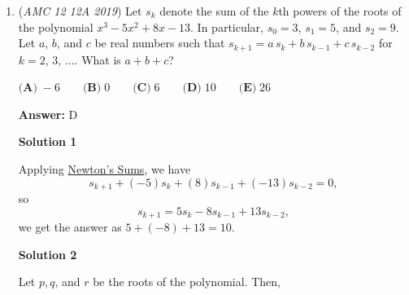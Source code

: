 \begin{enumerate}
 - The Pigeonhole Principle isn't really necessary here: After noting from the first solution that any row that contains evens must contain two evens, the result follows that the four evens must form the corners of a rectangle.

 



\textbf{Solution 3}

Note that there are 5 odds and 4 evens, and for three numbers to sum an odd number, either 1 or three must be odd. Hence, one column must be all odd and one row must be all odd. First, we choose a row, for which there are three choices and within the row P(5,3). There are 3! ways to order the remaining odds and 4! ways to order the evens. The total possible ways is 9!. $\frac{3 \cdot P(5,3) \cdot 3! \cdot 4!}{9!}=\boxed{\textbf{(B) }\frac{1}{14}}$




\textbf{Solution 4}

Note that the odd sums are only formed by, $(O, O, O)$ or any permutation of $(O, E, E)$. When looking at a 3x3 box, we realize that there must always be one column that is odd and one row that is odd. Calculating the probability of one permutation of this we get:

 


	\item (\textit{AMC 12 12A 2019}) Let $s_k$ denote the sum of the $\textit{k}$th powers of the roots of the polynomial $x^3-5x^2+8x-13$. In particular, $s_0=3$, $s_1=5$, and $s_2=9$. Let $a$, $b$, and $c$ be real numbers such that $s_{k+1} = a \, s_k + b \, s_{k-1} + c \, s_{k-2}$ for $k = 2$, $3$, $....$ What is $a+b+c$?


 $\textbf{(A)} \; -6 \qquad \textbf{(B)} \; 0 \qquad \textbf{(C)} \; 6 \qquad \textbf{(D)} \; 10 \qquad \textbf{(E)} \; 26$

 \textbf{Answer: }D



\textbf{Solution 1}

Applying \href{https://artofproblemsolving.com/wiki/index.php/Newton's\_Sums}{Newton's Sums}, we have
 \[s_{k+1}+(-5)s_k+(8)s_{k-1}+(-13)s_{k-2}=0,\]so
 \[s_{k+1}=5s_k-8s_{k-1}+13s_{k-2},\]we get the answer as $5+(-8)+13=10$.

 



\textbf{Solution 2}

Let $p, q$, and $r$ be the roots of the polynomial. Then,


\end{enumerate}
